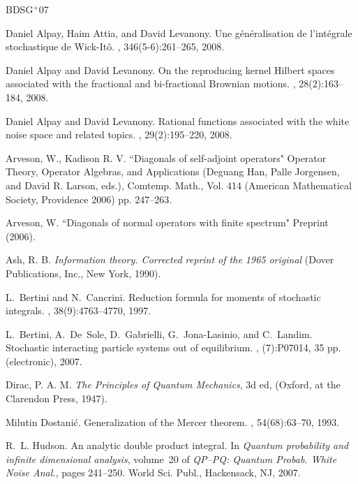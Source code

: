 \documentclass{amsart}
\theoremstyle{definition}
\theoremstyle{remark}
\numberwithin{equation}{section}
\begin{document}
\begin{thebibliography}{BDSG{{$^{{+}}$}}07}

Daniel Alpay, Haim Attia, and David Levanony.
\newblock Une g\'en\'eralisation de l'int\'egrale stochastique de
  {W}ick-{I}t\^o.
, 346(5-6):261--265, 2008.

Daniel Alpay and David Levanony.
\newblock On the reproducing kernel {H}ilbert spaces associated with the
  fractional and bi-fractional {B}rownian motions.
, 28(2):163--184, 2008.

Daniel Alpay and David Levanony.
\newblock Rational functions associated with the white noise space and related
  topics.
, 29(2):195--220, 2008.

 Arveson,  W., Kadison R. V. ``Diagonals of self-adjoint operators" Operator Theory, Operator Algebras, and Applications
(Deguang Han, Palle Jorgensen, and David R. Larson, eds.), Comtemp. Math., Vol. 414 (American Mathematical Society, Providence 2006) pp. 247--263. 

 Arveson, W. ``Diagonals of normal operators with finite spectrum" 
Preprint (2006).

 Ash, R. B. {\em Information theory. Corrected reprint of the 1965 original} (Dover Publications, Inc., New York, 1990).

L.~Bertini and N.~Cancrini.
\newblock Reduction formula for moments of stochastic integrals.
, 38(9):4763--4770, 1997.

L.~Bertini, A.~De~Sole, D.~Gabrielli, G.~Jona-Lasinio, and C.~Landim.
\newblock Stochastic interacting particle systems out of equilibrium.
, (7):P07014, 35 pp. (electronic),
  2007.

 Dirac, P. A. M. {\em The Principles of Quantum Mechanics}, 3d ed, (Oxford, at the Clarendon Press, 1947).

Milutin Dostani{\'c}.
\newblock Generalization of the {M}ercer theorem.
, 54(68):63--70, 1993.

R.~L. Hudson.
\newblock An analytic double product integral.
\newblock In {\em Quantum probability and infinite dimensional analysis},
  volume~20 of {\em QP--PQ: Quantum Probab. White Noise Anal.}, pages 241--250.
  World Sci. Publ., Hackensack, NJ, 2007.


\end{thebibliography}
\end{document}

